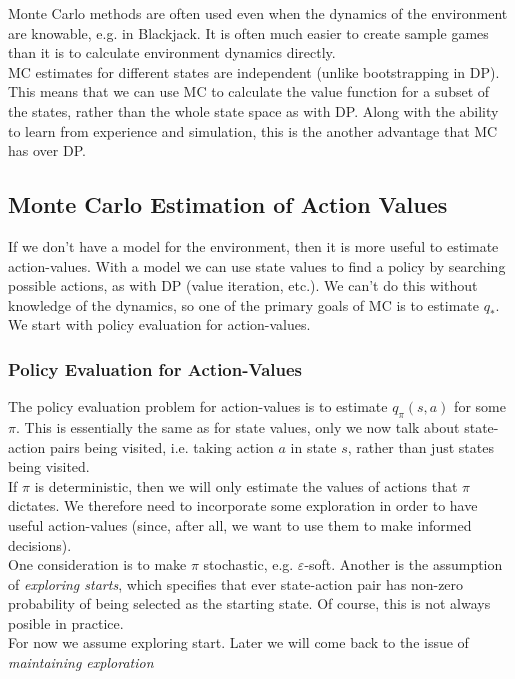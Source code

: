 Monte Carlo methods are often used even when the dynamics of the environment are knowable, e.g. in Blackjack. It is often much easier to create sample games than it is to calculate environment dynamics directly.\\

MC estimates for different states are independent (unlike bootstrapping in DP). This means that we can use MC to calculate the value function for a subset of the states, rather than the whole state space as with DP. Along with the ability to learn from experience and simulation, this is the another advantage that MC has over DP.

\subsection{Monte Carlo Estimation of Action Values}
If we don't have a model for the environment, then it is more useful to estimate action-values. With a model we can use state values to find a policy by searching possible actions, as with DP (value iteration, etc.). We can't do this without knowledge of the dynamics, so one of the primary goals of MC is to estimate $q_*$. We start with policy evaluation for action-values.

\subsubsection*{Policy Evaluation for Action-Values}
The policy evaluation problem for action-values is to estimate $q_\pi(s, a)$ for some $\pi$. This is essentially the same as for state values, only we now talk about state-action pairs being visited, i.e. taking action $a$ in state $s$, rather than just states being visited.\\

If $\pi$ is deterministic, then we will only estimate the values of actions that $\pi$ dictates. We therefore need to incorporate some exploration in order to have useful action-values (since, after all, we want to use them to make informed decisions).\\

One consideration is to make $\pi$ stochastic, e.g. $\varepsilon$-soft. Another is the assumption of \emph{exploring starts}, which specifies that ever state-action pair has non-zero probability of being selected as the starting state. Of course, this is not always posible in practice.\\

For now we assume exploring start. Later we will come back to the issue of \emph{maintaining exploration}

